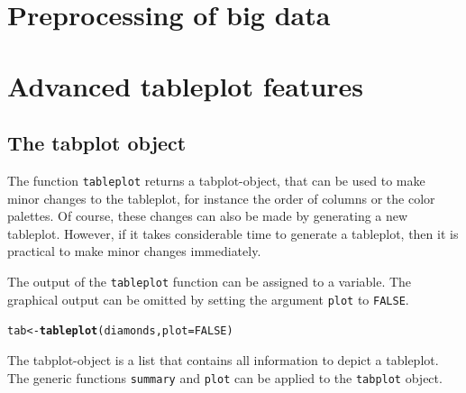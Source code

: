 \documentclass[11pt, fleqn, a4paper]{article}\usepackage{graphicx, color}
\makeatletter
\newcommand{\hlfunctioncall}[1]{\textcolor[rgb]{0.501960784313725,0,0.329411764705882}{\textbf{#1}}}%
\newenvironment{kframe}{%
 \def\at@end@of@kframe{}%
 \ifinner\ifhmode%
  \def\at@end@of@kframe{\end{minipage}}%
  \begin{minipage}{\columnwidth}%
 \fi\fi%
 \def\FrameCommand##1{\hskip\@totalleftmargin \hskip-\fboxsep
 \colorbox{shadecolor}{##1}\hskip-\fboxsep
     \hskip-\linewidth \hskip-\@totalleftmargin \hskip\columnwidth}%
 \MakeFramed {\advance\hsize-\width
   \@totalleftmargin\z@ \linewidth\hsize
   \@setminipage}}%
 {\par\unskip\endMakeFramed%
 \at@end@of@kframe}
\newenvironment{knitrout}{}{} %
\makeatother
\begin{document}
\section{Preprocessing of big data}


\section{Advanced tableplot features}

\subsection{The tabplot object}\label{sectab}

The function {\tt tableplot} returns a tabplot-object, that can be used to make minor changes to the tableplot, for instance the order of columns or the color palettes. Of course, these changes can also be made by generating a new tableplot. However, if it takes considerable time to generate a tableplot, then it is practical to make minor changes immediately.

The output of the {\tt tableplot} function can be assigned to a variable. The graphical output can be omitted by setting the argument {\tt plot} to {\tt FALSE}.

\begin{knitrout}
\color{fgcolor}\begin{kframe}
\begin{alltt}
tab <- \hlfunctioncall{tableplot}(diamonds, plot = FALSE)
\end{alltt}
\end{kframe}
\end{knitrout}


The tabplot-object is a list that contains all information to depict a tableplot. The generic functions {\tt summary} and {\tt plot} can be applied to the {\tt tabplot} object.
\end{document}
